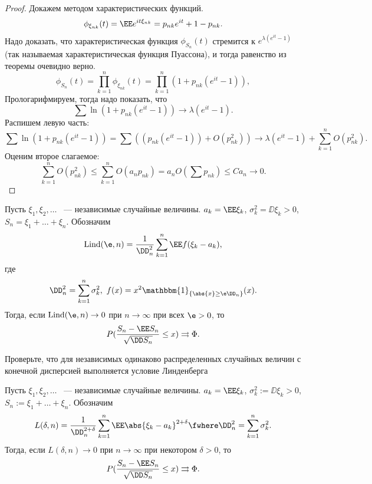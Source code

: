  \begin{proof} Докажем методом характеристических функций.
     $$\phi_{\xi_{nk}}(t) = \EE e^{it\xi_{nk}} = p_{nk}e^{it} + 1 - p_{nk}.$$
    Надо доказать, что характеристическая функция
     $\phi_{S_n}(t)$
     стремится к $e^{\lambda(e^{it} - 1)}$  (так называемая характеристическая функция Пуассона), и тогда равенство из теоремы очевидно верно.
      $$\phi_{S_n}(t) = \prod\limits_{k=1} ^ n \phi_{\xi_{nk}}(t) = \prod\limits_{k=1} ^ n (1+p_{nk}(e^{it} - 1)),$$
     Прологарифмируем, тогда надо показать, что
     $$\sum \ln(1+p_{nk}(e^{it} - 1)) \to \lambda (e^{it} - 1).$$
    Распишем левую часть:
     $$\sum \ln(1+p_{nk}(e^{it} - 1)) = \sum((p_{nk}(e^{it} - 1)) + O(p_{nk}^2)) \rightarrow  \lambda (e^{it} - 1) + \sum\limits_{k=1} ^ n O(p_{nk} ^ 2).$$
    Оценим второе слагаемое:
     $$\sum\limits_{k=1} ^ n O(p_{nk} ^ 2) \le \sum\limits_{k=1} ^ n O(a_np_{nk}) = a_n O\left(\sum p_{nk}\right) \le Ca_n \rightarrow 0.$$

 \end{proof}

 \begin{theorem} Пусть
     $\xi_1, \xi_2, \ldots$ ~--- независимые случайные величины.
     $a_k = \EE \xi_k$, $\sigma_k^2 =  \DD\xi_k > 0$, $S_n = \xi_1 + \ldots + \xi_n$. Обозначим
     $$\text{Lind}(\e, n)= \frac{1}{ \DD_n^2} \sum\limits_{k=1} ^ n  \EE f(\xi_k - a_k),$$
     где
     \begin{gather*}
         \DD_n^2 = \sum\limits_{k=1} ^ n \sigma_k^2, \ f(x) = x^2\mathbbm{1}_{\{\abs{x}\ge \e  \DD_n\}}(x).
     \end{gather*}
    Тогда, если $\text{Lind}(\e, n) \to 0$ при $n\rightarrow \infty$ при всех $\e > 0$, то
    $$P(\frac{S_n - \EE S_n}{\sqrt{ \DD S_n}}\le x)\rightrightarrows \Phi.$$
 \end{theorem}

 \begin{exercise}
     Проверьте, что для независимых одинаково распределенных случайных величин с конечной дисперсией выполняется условие Линденберга
 \end{exercise}

 \begin{theorem} Пусть
     $\xi_1, \xi_2, \ldots$ ~--- независимые случайные величины.
     $a_k = \EE \xi_k$, $\sigma_k^2 :=  \DD\xi_k > 0$, $S_n := \xi_1 + \ldots + \xi_n$. Обозначим
  $$L(\delta, n)=\frac{1}{ \DD_n^{2+\delta}} \sum\limits_{k=1} ^ n  \EE \abs{\xi_k - a_k}^{2+\delta}\fwhere \DD_n^2 = \sum\limits_{k=1} ^ n \sigma_k^2.$$
    Тогда, если
     $L(\delta, n) \to 0$ при $n \to \infty$ при некотором $\delta > 0$, то
     $$P(\frac{S_n - \EE S_n}{\sqrt{ \DD S_n}}\le x)\rightrightarrows \Phi.$$
 \end{theorem}

